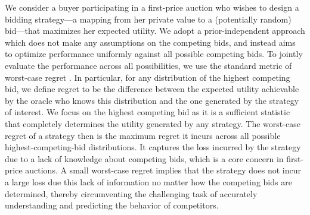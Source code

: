 We consider a buyer participating in a first-price auction who wishes to design a bidding strategy---a mapping from her private value to a (potentially random) bid---that maximizes her expected utility. 
We adopt a prior-independent approach which does not make any assumptions on the competing bids, and instead aims to optimize performance uniformly against all possible competing bids. To jointly evaluate the performance across all possibilities, we use the standard metric of worst-case regret \citep{savage1951theory}. In particular, for any distribution of the highest competing bid, we define regret to be the difference between the expected utility achievable by the oracle who knows this distribution and the one generated by the strategy of interest. We focus on the highest competing bid as it is a sufficient statistic that completely determines the utility generated by any strategy. The worst-case regret of a strategy then is the maximum regret it incurs across all possible highest-competing-bid distributions. It captures the loss incurred by the strategy due to a lack of knowledge about competing bids, which is a core concern in first-price auctions. A small worst-case regret implies that the strategy does not incur a large loss due this lack of information no matter how the competing bids are determined, thereby circumventing the challenging task of accurately understanding and predicting the behavior of competitors.


